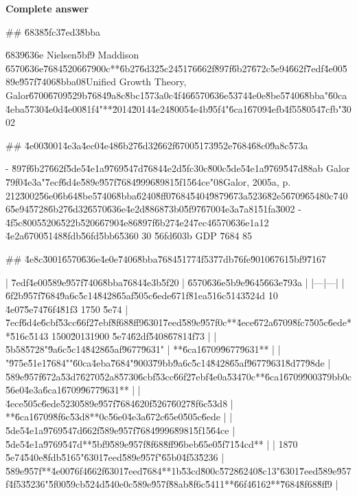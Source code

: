 \documentclass[10pt]{article}
\begin{document}
\textbf{Complete answer}
\begin{AnswerText}
## \u6838\u5fc3\u7ed3\u8bba

\u6839\u636e Nielsen\u5bf9 Maddison \u6570\u636e\u7684\u5206\u6790\uff0c**\u6b27\u6d32\u5c24\u5176\u662f\u897f\u6b27\u672c\u5e94\u662f\u7edf\u4e00\u589e\u957f\u7406\u8bba\uff08Unified Growth Theory, Galor\u6700\u6709\u529b\u7684\u9a8c\u8bc1\u573a\uff0c\u4f46\u6570\u636e\u5374\u4e0e\u8be5\u7406\u8bba"\u60ca\u4eba\u5730\u4e0d\u4e00\u81f4"**\u2014\u2014\u4e24\u8005\u4e4b\u95f4"\u6ca1\u6709\u4efb\u4f55\u8054\u7cfb"\u3002

## \u4e00\u3001\u4e3a\u4ec0\u4e48\u6b27\u6d32\u662f\u6700\u5173\u952e\u7684\u68c0\u9a8c\u573a

- \u897f\u6b27\u662f\u5de5\u4e1a\u9769\u547d\u7684\u4e2d\u5fc3\uff0c\u800c\u5de5\u4e1a\u9769\u547d\u88ab Galor \u79f0\u4e3a"\u7ecf\u6d4e\u589e\u957f\u7684\u9996\u8981\u5f15\u64ce"\uff08Galor, 2005a, p. 212\u3002\u56e0\u6b64\u8be5\u7406\u8bba\u6240\u8ff0\u7684\u5404\u9879\u673a\u5236\u82e5\u6709\u6548\uff0c\u7406\u5e94\u5728\u6b27\u6d32\u6570\u636e\u4e2d\u8868\u73b0\u5f97\u6700\u4e3a\u7a81\u51fa\u3002
- \u4f5c\u8005\u5206\u522b\u5206\u6790\u4e86\u897f\u6b27\u4e24\u7ec4\u6570\u636e\uff1a12 \u4e2a\u6700\u5148\u8fdb\u56fd\u5bb6\u5360 30 \u56fd\u603b GDP \u7684 85%

## \u4e8c\u3001\u6570\u636e\u4e0e\u7406\u8bba\u7684\u5177\u4f53\u77db\u76fe\u9010\u6761\u5bf9\u7167

| \u7edf\u4e00\u589e\u957f\u7406\u8bba\u7684\u4e3b\u5f20 | \u6570\u636e\u5b9e\u9645\u663e\u793a |
|---|---|
| \u6f2b\u957f\u7684\u9a6c\u5c14\u8428\u65af\u505c\u6ede\u671f\u81ea\u516c\u5143\u524d 10 \u4e07\u5e74\u76f4\u81f3 1750 \u5e74 | \u7ecf\u6d4e\u6cbf\u53cc\u66f2\u7ebf\u8f68\u8ff9\u6301\u7eed\u589e\u957f\uff0c**\u4ece\u672a\u6709\u8fc7\u505c\u6ede**\u516c\u5143 1500\u20131900 \u5e74\u62df\u5408\u6781\u4f73 |
| \u5b58\u5728"\u9a6c\u5c14\u8428\u65af\u9677\u9631" | **\u6ca1\u6709\u9677\u9631** |
| "\u975e\u51e1\u7684""\u60ca\u4eba\u7684"\u9003\u79bb\u9a6c\u5c14\u8428\u65af\u9677\u9631\u8d77\u98de | \u589e\u957f\u672a\u53d7\u6270\u52a8\u5730\u6cbf\u53cc\u66f2\u7ebf\u4e0a\u5347\uff0c**\u6ca1\u6709\u9003\u79bb\uff0c\u56e0\u4e3a\u6ca1\u6709\u9677\u9631** |
| \u4ece\u505c\u6ede\u5230\u589e\u957f\u7684\u620f\u5267\u6027\u8f6c\u53d8 | **\u6ca1\u6709\u8f6c\u53d8**\uff0c\u56e0\u4e3a\u672c\u65e0\u505c\u6ede |
| \u5de5\u4e1a\u9769\u547d\u662f\u589e\u957f\u7684\u9996\u8981\u5f15\u64ce | \u5de5\u4e1a\u9769\u547d**\u5bf9\u589e\u957f\u8f68\u8ff9\u6beb\u65e0\u5f71\u54cd** |
| 1870 \u5e74\u540e\u8fdb\u5165"\u6301\u7eed\u589e\u957f"\u65b0\u4f53\u5236 | \u589e\u957f**\u4e00\u76f4\u662f\u6301\u7eed\u7684**\uff1b\u53cd\u800c\u5728\u6240\u8c13"\u6301\u7eed\u589e\u957f\u4f53\u5236"\u5f00\u59cb\u524d\u540e\uff0c\u589e\u957f\u88ab\u8f6c\u5411**\u66f4\u6162**\u7684\u8f68\u8ff9 |


\end{AnswerText}
\end{document}
